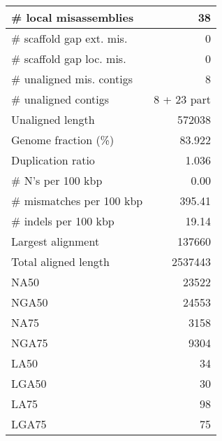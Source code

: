 \documentclass[12pt,a4paper]{article}
\begin{document}
\begin{table}[ht]
\begin{center}
\begin{tabular}{|l*{1}{|r}|}
\# local misassemblies & 38 \\ \hline
\# scaffold gap ext. mis. & 0 \\ \hline
\# scaffold gap loc. mis. & 0 \\ \hline
\# unaligned mis. contigs & 8 \\ \hline
\# unaligned contigs & 8 + 23 part \\ \hline
Unaligned length & 572038 \\ \hline
Genome fraction (\%) & 83.922 \\ \hline
Duplication ratio & 1.036 \\ \hline
\# N's per 100 kbp & 0.00 \\ \hline
\# mismatches per 100 kbp & 395.41 \\ \hline
\# indels per 100 kbp & 19.14 \\ \hline
Largest alignment & 137660 \\ \hline
Total aligned length & 2537443 \\ \hline
NA50 & 23522 \\ \hline
NGA50 & 24553 \\ \hline
NA75 & 3158 \\ \hline
NGA75 & 9304 \\ \hline
LA50 & 34 \\ \hline
LGA50 & 30 \\ \hline
LA75 & 98 \\ \hline
LGA75 & 75 \\ \hline
\end{tabular}
\end{center}
\end{table}
\end{document}
